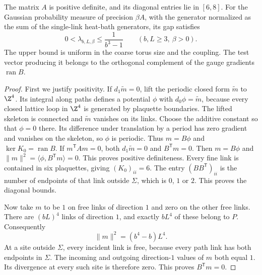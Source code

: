 \begin{theorem}\label{round26:slow}
The matrix $A$ is positive definite, and its diagonal entries lie in
$[6,8]$. For the Gaussian probability measure of precision $\beta A$,
with the generator normalized as the sum of the single-link heat-bath
generators, its gap satisfies
\[
 0<\lambda_{b,L,\beta}\le\frac{1}{b^3-1}
 \qquad(b,L\ge3,\ \beta>0).
\]
The upper bound is uniform in the coarse torus size and the coupling.
The test vector producing it belongs to the orthogonal complement of
the gauge gradients $\operatorname{ran}B$.
\end{theorem}
\begin{proof}
First we justify positivity. If $d_1\widetilde m=0$, lift the periodic
closed form $\widetilde m$ to $\Z^4$. Its integral along paths defines a
potential $\phi$ with $d_0\phi=\widetilde m$, because every closed lattice
loop in $\Z^4$ is generated by plaquette boundaries. The lifted skeleton
is connected and $\widetilde m$ vanishes on its links. Choose the additive
constant so that $\phi=0$ there. Its difference under translation by a
period has zero gradient and vanishes on the skeleton, so $\phi$ is
periodic. Thus $m=B\phi$ and $\ker K_0=\operatorname{ran}B$.
If $m^{\mathsf T}Am=0$, both $d_1\widetilde m=0$ and $B^{\mathsf T}m=0$.
Then $m=B\phi$ and $\|m\|^2=\langle\phi,B^{\mathsf T}m\rangle=0$.
This proves positive definiteness. Every fine link is contained in six
plaquettes, giving $(K_0)_{ii}=6$. The entry $(BB^{\mathsf T})_{ii}$ is
the number of endpoints of that link outside $\Sigma$, which is $0$, $1$
or $2$. This proves the diagonal bounds.

Now take $m$ to be $1$ on free links of direction $1$ and zero on the
other free links. There are $(bL)^4$ links of direction $1$, and exactly
$bL^4$ of these belong to $P$. Consequently
\begin{equation}\label{round26:norm}
 \|m\|^2=(b^4-b)L^4.
\end{equation}
At a site outside $\Sigma$, every incident link is free, because every
path link has both endpoints in $\Sigma$. The incoming and outgoing
direction-$1$ values of $m$ both equal $1$. Its divergence at every such
site is therefore zero. This proves $B^{\mathsf T}m=0$.


\end{proof}

